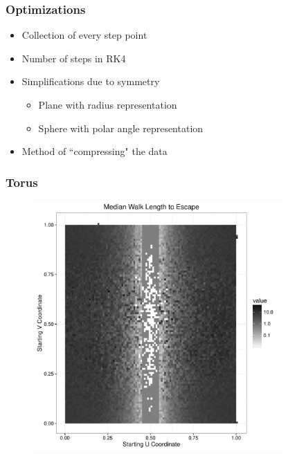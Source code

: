 \documentclass{beamer}
\begin{document}
\begin{frame}
	
	\frametitle{Optimizations}
	
	\begin{itemize}
		\item Collection of every step point
		\item Number of steps in RK4
		\item Simplifications due to symmetry
		\begin{itemize}
			\item Plane with radius representation
			\item Sphere with polar angle representation
		\end{itemize}
		\item Method of ``compressing" the data
	\end{itemize}
	
\end{frame}


\begin{frame}[noframenumbering]
	
	\frametitle{Torus}
	
	\begin{figure}
		\includegraphics[width=0.85\textwidth]{images/TorusUBand.pdf}
	\end{figure}
	
\end{frame}
\end{document}
